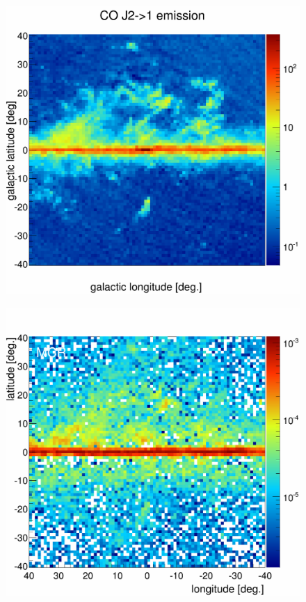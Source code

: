 \begin{figure}[h]
  \centering
  \begin{minipage}[h]{0.45\textwidth}
	  \centering
	  \includegraphics[width=\linewidth]{pic/results/COmap_GC.png}	  
  	  \subcaption{}
	  \label{fig:CO_GC}
  \end{minipage}
  \hfill
  \begin{minipage}[h]{0.45\textwidth}
	  \centering
	  \includegraphics[width=\linewidth]{pic/results/MCRmapGC.png}

\end{minipage}
\end{figure}
